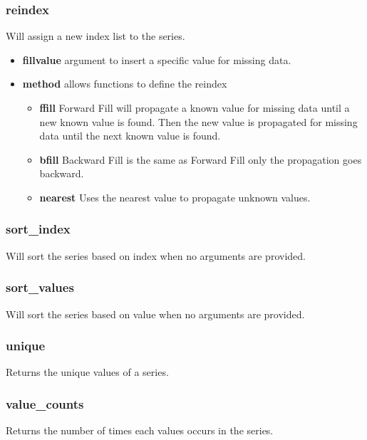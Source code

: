 \subsubsection{reindex}
Will assign a new index list to the series.
  \begin{itemize}

    \item \textbf{fill\textunderscore value} argument to insert a specific
      value for missing data.

    \item \textbf{method} allows functions to define the reindex
      \begin{itemize}

        \item \textbf{ffill} Forward Fill will propagate a known value for
          missing data until a new known value is found.  Then the new value
          is propagated for missing data until the next known value is found.

        \item \textbf{bfill} Backward Fill is the same as Forward Fill only
          the propagation goes backward.

        \item \textbf{nearest} Uses the nearest value to propagate unknown
          values.
      \end{itemize}
  \end{itemize}

\subsubsection{sort\_index}
Will sort the series based on index when no arguments are provided.

\subsubsection{sort\_values}
Will sort the series based on value when no arguments are provided.

\subsubsection{unique}
Returns the unique values of a series.

\subsubsection{value\_counts}
Returns the number of times each values occurs in the series.

